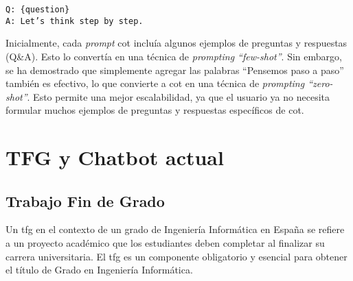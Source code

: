 \begin{verbatim}
Q: {question}
A: Let’s think step by step.
\end{verbatim}

Inicialmente, cada \textit{prompt} \acrshort{cot} incluía algunos ejemplos de preguntas y respuestas (Q\&A). Esto lo convertía en una técnica de \textit{prompting ``few-shot''}. Sin embargo, se ha demostrado que simplemente agregar las palabras ``Pensemos paso a paso'' también es efectivo, lo que convierte a \acrshort{cot} en una técnica de \textit{prompting ``zero-shot''}. Esto permite una mejor escalabilidad, ya que el usuario ya no necesita formular muchos ejemplos de preguntas y respuestas específicos de \acrshort{cot}.

\section{TFG y Chatbot actual}

\subsection{Trabajo Fin de Grado}

Un \acrfull{tfg} en el contexto de un grado de Ingeniería Informática en España se refiere a un proyecto académico que los estudiantes deben completar al finalizar su carrera universitaria. El \acrshort{tfg} es un componente obligatorio y esencial para obtener el título de Grado en Ingeniería Informática.

